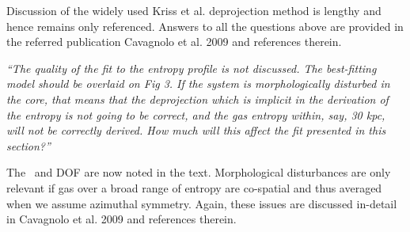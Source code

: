 \documentclass[11pt]{article}
\begin{document}
Discussion of the widely used Kriss et al. deprojection method is
lengthy and hence remains only referenced. Answers to all the
questions above are provided in the referred publication Cavagnolo et
al. 2009 and references therein.

\hrulefill

{\it{``The quality of the fit to the entropy profile is not
    discussed. The best-fitting model should be overlaid on Fig 3. If
    the system is morphologically disturbed in the core, that means
    that the deprojection which is implicit in the derivation of the
    entropy is not going to be correct, and the gas entropy within,
    say, 30 kpc, will not be correctly derived. How much will this
    affect the fit presented in this section?''}}

The \chisq\ and DOF are now noted in the text. Morphological
disturbances are only relevant if gas over a broad range of entropy
are co-spatial and thus averaged when we assume azimuthal
symmetry. Again, these issues are discussed in-detail in Cavagnolo et
al. 2009 and references therein.
\end{document}
